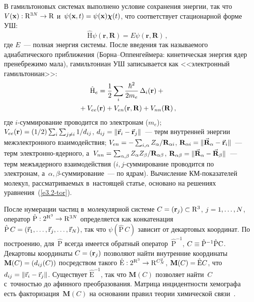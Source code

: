 \begin{multicols}{2}
\smallskip

     В гамильтоновых системах выполнено условие сохранения энергии, так 
что $V(\mathbf{x}): \mathrm{R}^{3N}\hm\to \mathrm{R}$ 
и~$\psi(\mathbf{x},t)\hm= \psi(\mathbf{x})\bm{\chi}(t)$, что соответствует 
стационарной форме УШ:
     \begin{equation*}
     \hat{\mathrm{H}}\psi(\mathbf{r},\mathbf{R})=E\psi(\mathbf{r},\mathbf{R})
\,,
     \end{equation*}
где $E$~--- полная энергия системы. После введения так называемого 
адиабатического приближения (Бор\-на--Оп\-пен\-гей\-ме\-ра: кинетическая 
энергия ядер пренебрежимо мала), гамильтониан УШ записывается как 
<<электронный гамильтониан>>:
\begin{multline}
\hat{\mathrm{H}}_e=\displaystyle\frac{\displaystyle 1\mathstrut}{\displaystyle 2\mathstrut} \sum\limits_i \displaystyle\frac{\displaystyle \hbar^2\mathstrut}{\displaystyle 2m_e\mathstrut} 
\,\Delta_i(\mathbf{r})+{}\\
{}+V_{ee}(\mathbf{r})+V_{en}(\mathbf{r},\mathbf{R})+ 
V_{nn}(\mathbf{R})\,,
\label{e3.2-tor}
\end{multline}
где $i$-суммирование проводится по электронам ($m_e$); 
$V_{ee}(\mathbf{r})\hm= (1/2)\sum\nolimits_i \sum\nolimits_{j\not= i} 1/d_{ij}$, 
$d_{ij}\hm= \| \vec{\mathbf{r}}_i\hm- \vec{\mathbf{r}}_j\|$~--- терм  
внут\-рен\-ней энергии межэлектронного взаимодействия; $V_{en}\hm=
 -\sum\nolimits_{i,\alpha} Z_{\alpha}/\mathbf{R}_{\alpha i}$,\linebreak 
$\mathbf{R}_{\alpha i} \hm= \|\vec{\mathbf{R}}_\alpha \hm- \vec{\mathbf{r}}_i\|$~--- 
терм элект\-рон\-но-ядер\-но\-го, а~$V_{nn}\hm= \sum\nolimits_{\alpha,\beta} 
Z_\alpha Z_\beta/\mathbf{R}_{\alpha\beta}$, $\mathbf{R}_{\alpha\beta}\hm= \| 
\vec{\mathbf{R}}_\alpha\hm- \vec{\mathbf{R}}_\beta \|$~--- терм межъядерного 
взаимодействия ($i,j$-суммирование проводится по электронам,  
а~$\alpha,\beta$-суммирование~--- по ядрам). Вычисление КМ-показателей 
молекул, рассматриваемых в~настоящей статье, основано на решениях 
уравнения~(\ref{e3.2-tor}).

     
     После нумерации частиц в~молекулярной сис\-те\-ме ${C}\hm= 
(\mathbf{r}_j) \hm\subset \mathrm{R}^3$, $j\hm= 1,\ldots , N$, оператор 
$\hat{\mathrm{P}}: 2^{\mathrm{R}^3}\hm\to \mathrm{R}^{3N}$ определяется 
как конкатенация $\hat{\mathrm{P}}\,{C}\hm= \left( \vec{\mathrm{r}}_1, 
\ldots , \vec{\mathrm{r}}_j, \ldots , \vec{\mathrm{r}}_N\right)$, так что 
$\psi(\hat{\mathrm{P}}\,{C})$ зависит от декартовых координат. По 
построению, для~$\hat{\mathrm{P}}$ всегда имеется обратный 
оператор~$\hat{\mathrm{P}}^{-1}$, ${C}\hm\equiv \hat{\mathrm{P}}^{-
1}\hat{\mathrm{P}}\mathrm{C}$. Декартовы координаты ${C}\hm= 
(\mathbf{r}_j)$ позволяют найти внутренние координаты 
$\mathbf{M}({C})\hm= (d_{ij}({C}))$ посредством такого 
$\hat{\mathrm{E}}: 2^{\mathrm{R}^3}\hm\to \mathrm{R}^{{C}_N^2}$, 
$\mathbf{M}({C})\hm= \hat{\mathrm{E}}{C}$, что $d_{ij}\hm= 
\| \vec{\mathrm{r}}_i-\vec{\mathrm{r}}_j\|$. Существует  
$\hat{\mathrm{E}}^{-1}$, так что $\mathbf{M}({C})$ позволяет 
найти~${C}$  с~точ\-ностью до афинного преобразования. Мат\-ри\-ца 
инцидентности хемографа есть факторизация~$\mathbf{M}({C})$ на 
основании правил теории химической  
связи~\cite{2-tor, 3-tor}.


\end{multicols}
